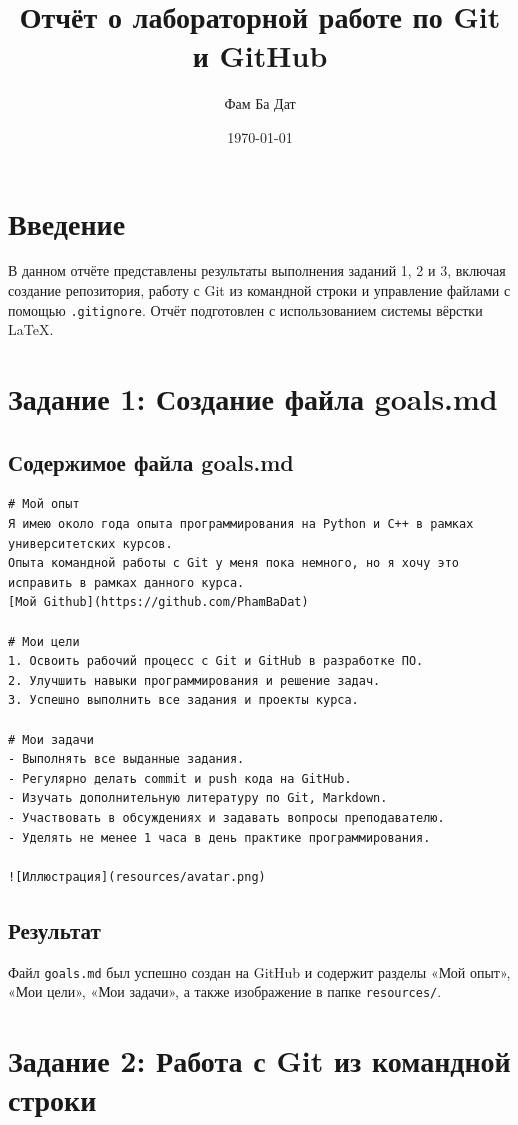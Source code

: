 \documentclass[a4paper, 12pt]{article}
\title{
Отчёт о лабораторной работе по Git и GitHub
}
\author{Фам Ба Дат}
\affil{407879, @BaDatPham}
\date{\today}
\begin{document}
\maketitle

\tableofcontents
\newpage

\section{Введение}
В данном отчёте представлены результаты выполнения заданий 1, 2 и 3,
включая создание репозитория, работу с Git из командной строки и управление файлами
с помощью \texttt{.gitignore}. Отчёт подготовлен с использованием системы
вёрстки LaTeX.

\section{Задание 1: Создание файла goals.md}

\subsection{Содержимое файла goals.md}
\begin{verbatim}
# Мой опыт
Я имею около года опыта программирования на Python и C++ в рамках университетских курсов. 
Опыта командной работы с Git у меня пока немного, но я хочу это исправить в рамках данного курса.
[Мой Github](https://github.com/PhamBaDat)

# Мои цели
1. Освоить рабочий процесс с Git и GitHub в разработке ПО.
2. Улучшить навыки программирования и решение задач.
3. Успешно выполнить все задания и проекты курса.

# Мои задачи
- Выполнять все выданные задания.
- Регулярно делать commit и push кода на GitHub.
- Изучать дополнительную литературу по Git, Markdown.
- Участвовать в обсуждениях и задавать вопросы преподавателю.
- Уделять не менее 1 часа в день практике программирования.

![Иллюстрация](resources/avatar.png)
\end{verbatim}

\subsection{Результат}
Файл \texttt{goals.md} был успешно создан на GitHub и содержит разделы
«Мой опыт», «Мои цели», «Мои задачи», а также изображение в папке \texttt{resources/}.

\section{Задание 2: Работа с Git из командной строки}
\end{document}
